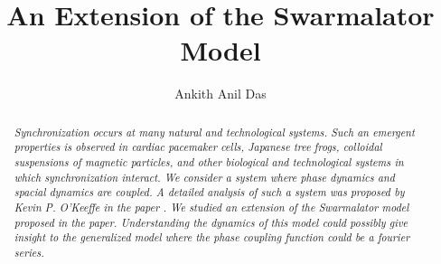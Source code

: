 \documentclass[superscriptaddress,reprint,amssymb, amsmath,aps, pre]{revtex4-1}
\begin{document}
\title{An Extension of the Swarmalator Model}
\author{Ankith Anil Das}
\begin{abstract}
{
    \it Synchronization occurs at many natural and technological systems. Such an emergent properties is observed in cardiac pacemaker cells, Japanese tree frogs, colloidal suspensions of magnetic particles, and other biological and technological systems in which synchronization interact. We consider a system where phase dynamics and spacial dynamics are coupled. A detailed analysis of such a system was proposed by Kevin P. O'Keeffe in the paper . We studied an extension of the Swarmalator model proposed in the paper. Understanding the dynamics of this model could possibly give insight to the generalized model where the phase coupling function could be a fourier series.
}
\end{abstract}

\maketitle
%



\end{document}
